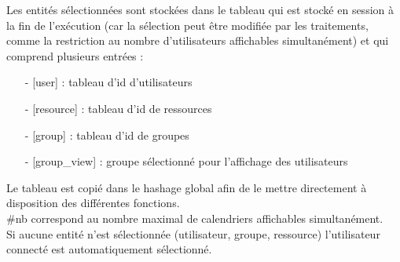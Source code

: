 Les entités sélectionnées sont stockées dans le tableau  qui est stocké en session à la fin de l'exécution (car la sélection peut être modifiée par les traitements, comme la restriction au nombre d'utilisateurs affichables simultanément) et qui comprend plusieurs entrées :
\begin{itemize}
\item[-] [user] : tableau d'id d'utilisateurs
\item[-] [resource] : tableau d'id de ressources
\item[-] [group] : tableau d'id de groupes
\item[-] [group\_view] : groupe sélectionné pour l'affichage des utilisateurs
\end{itemize}
\vspace{0.3cm}

Le tableau  est copié dans le hashage global  afin de le mettre directement à disposition des différentes fonctions.\\

\#nb correspond au nombre maximal de calendriers affichables simultanément.\\

Si aucune entité n'est sélectionnée (utilisateur, groupe, ressource) l'utilisateur connecté est automatiquement sélectionné.\\


